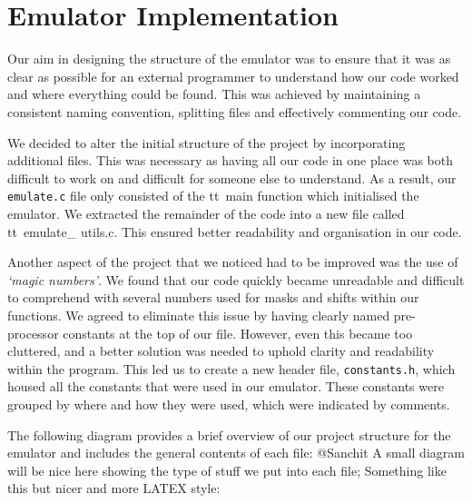 \documentclass[10pt]{article}
\begin{document}
\section*{Emulator Implementation}
Our aim in designing the structure of the emulator was to ensure that it was as clear as possible for an external
programmer to understand how our code worked and where everything could be found. This was achieved by
maintaining a consistent naming convention, splitting files and effectively commenting our code.


We decided to alter the initial structure of the project by incorporating additional files. This was necessary as
having all our code in one place was both difficult to work on and difficult for someone else to understand. As
a result, our {\tt emulate.c} file only consisted of the {tt\ main} function which initialised the emulator. We extracted the
remainder of the code into a new file called {tt\ emulate\_ utils.c}. This ensured better readability and organisation in our code.
 

Another aspect of the project that we noticed had to be improved was the use of \textsl{‘magic numbers’}. We found
that our code quickly became unreadable and difficult to comprehend with several numbers used for masks
and shifts within our functions. We agreed to eliminate this issue by having clearly named pre-processor
constants at the top of our file. However, even this became too cluttered, and a better solution was needed to
uphold clarity and readability within the program. This led us to create a new header file, {\tt constants.h}, which
housed all the constants that were used in our emulator. These constants were grouped by where and how
they were used, which were indicated by comments.


The following diagram provides a brief overview of our project structure for the emulator and includes the
general contents of each file:
@Sanchit A small diagram will be nice here showing the type of stuff we put into each file; Something like this
but nicer and more LATEX style:

\end{document}

